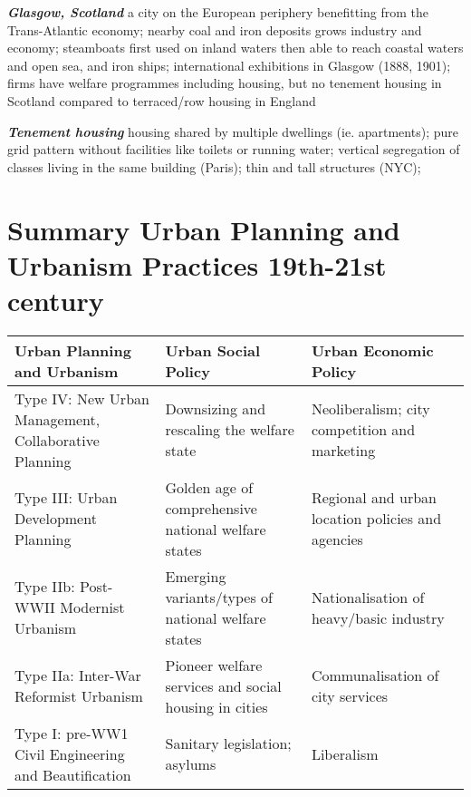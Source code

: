 \documentclass{article}
\newcommand{\bisection}[1]{\textbf{\textit{#1}}}
\begin{document}
\bisection{Glasgow, Scotland} a city on the European periphery benefitting from the Trans-Atlantic economy; nearby coal and iron deposits grows industry and economy; steamboats first used on inland waters then able to reach coastal waters and open sea, and iron ships;   international exhibitions in Glasgow (1888, 1901); firms have welfare programmes including housing, but no tenement housing in Scotland compared to terraced/row housing in England

\bisection{Tenement housing} housing shared by multiple dwellings (ie. apartments); pure grid pattern without facilities like toilets or running water; vertical segregation of classes living in the same building (Paris); thin and tall structures (NYC);

\pagebreak
\section{Summary Urban Planning and Urbanism Practices 19th-21st century}

\begin{center}
\begin{tabularx}{\textwidth} { 
  | >{\raggedright\arraybackslash}X 
  | >{\raggedright\arraybackslash}X 
  | >{\raggedright\arraybackslash}X | }
  \hline
  Urban Planning and Urbanism & Urban Social Policy & Urban Economic Policy \\ 
        \hline
  Type IV: New Urban Management, Collaborative Planning
  & Downsizing and rescaling the welfare state
  & Neoliberalism; city competition and marketing \\ 
      \hline
  Type III: Urban Development Planning
  & Golden age of comprehensive national welfare states
  & Regional and urban location policies and agencies \\ 
      \hline
  Type IIb: Post-WWII Modernist Urbanism 
  & Emerging variants/types of national welfare states
  & Nationalisation of heavy/basic industry \\ 
    \hline
  Type IIa: Inter-War Reformist Urbanism 
  & Pioneer welfare services and social housing in cities 
  & Communalisation of city services \\ 
  \hline
  Type I: pre-WW1 Civil Engineering and Beautification 
  & Sanitary legislation; asylums 
  & Liberalism \\ 
  \hline
\end{tabularx}
\end{center}
\end{document}
